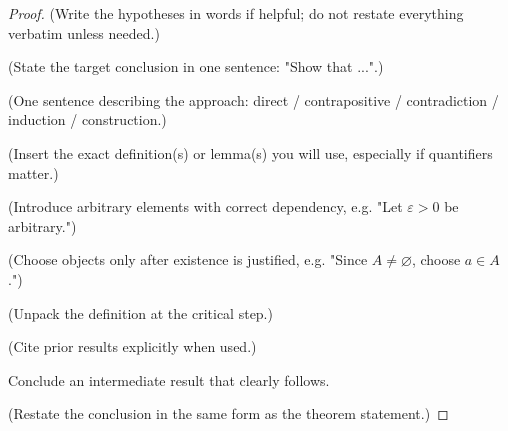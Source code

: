 \begin{proof}
\Given (Write the hypotheses in words if helpful; do not restate everything verbatim unless needed.)

\Goal (State the target conclusion in one sentence: "Show that ...".)

\Strategy (One sentence describing the approach: direct / contrapositive / contradiction / induction / construction.)

\Recall (Insert the exact definition(s) or lemma(s) you will use, especially if quantifiers matter.)


\Let (Introduce arbitrary elements with correct dependency, e.g. "Let $\varepsilon>0$ be arbitrary.")

\Choose (Choose objects only after existence is justified, e.g. "Since $A\neq\varnothing$, choose $a\in A$.")

\ByDef (Unpack the definition at the critical step.)

 (Cite prior results explicitly when used.)

\Therefore Conclude an intermediate result that clearly follows.

\Hence (Restate the conclusion in the same form as the theorem statement.)
\AsReq
\end{proof}



